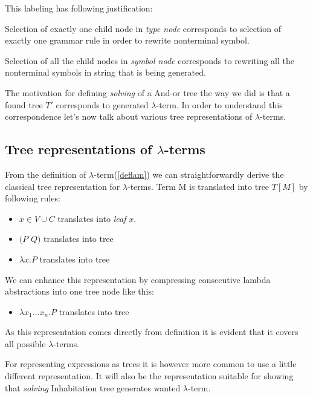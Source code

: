 \documentclass[12pt,a4paper]{report}
\newcommand{\lterm}{$\lambda$-term\xspace}
\newcommand{\lterms}{$\lambda$-terms\xspace}
\begin{document}
This labeling has following justification: 

Selection of exactly one
child node in \textit{type node} corresponds to selection of exactly one
grammar rule in order to rewrite nonterminal symbol.  

Selection of all the child nodes in \textit{symbol node} corresponds to 
rewriting all the nonterminal symbols in string that is being generated.  

The motivation for defining \textit{solving} of a And-or tree the way we did is that
a found tree $T'$ corresponds to generated \lterm. 
In order to understand this correspondence let's now talk about various tree representations
of \lterms.

\subsection{Tree representations of \lterms}
\label{tree-reps}

From the definition of \lterm (\ref{deflam}) we can straightforwardly derive 
the classical tree representation for \lterms. Term M is translated into tree $T[M]$ by following rules:

\begin{itemize}
	\item $x \in V \cup C$ translates into \textit{leaf} $x$.
	\item $(P$ $Q)$ translates into tree\\
	\item $\lambda x . P$ translates into tree\\
\end{itemize}

We can enhance this representation by compressing consecutive lambda abstractions into one
tree node like this: 

\begin{itemize}
	\item $\lambda x_1 \dots x_n . P$ translates into tree\\
\end{itemize}

As this representation comes directly from definition it is evident 
that it covers all possible \lterms.

For representing expressions as trees it is however more common to use a little different
representation. It will also be the representation suitable for showing 
that \textit{solving} Inhabitation tree generates wanted \lterm.
\end{document}
